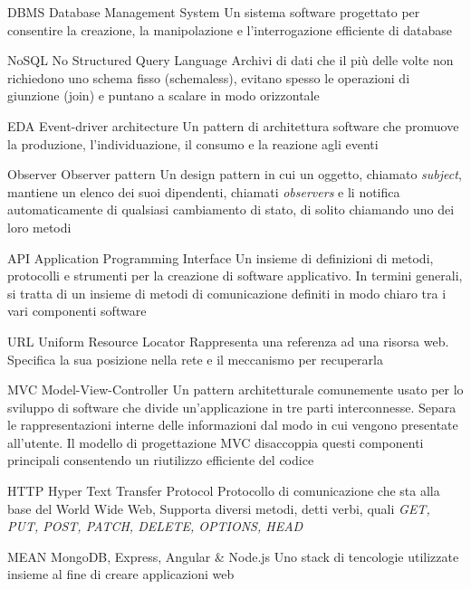 {DBMS}            %
{Database Management System}  %
{Un sistema software progettato per consentire la creazione, la manipolazione e l'interrogazione efficiente di database} %

{NoSQL}            %
{No Structured Query Language}  %
{Archivi di dati che il più delle volte non richiedono uno schema fisso (schemaless), evitano spesso le operazioni di giunzione (join) e puntano a scalare in modo orizzontale} %

{EDA}
{Event-driver architecture}
{Un pattern di architettura software che promuove la produzione, l'individuazione, il consumo e la reazione agli eventi}


{Observer}
{Observer pattern}
{Un design pattern in cui un oggetto, chiamato \textit{subject}, mantiene un elenco dei suoi dipendenti, chiamati \textit{observers} e li notifica automaticamente di qualsiasi cambiamento di stato, di solito chiamando uno dei loro metodi}


{API}
{Application Programming Interface}
{Un insieme di definizioni di metodi, protocolli e strumenti per la creazione di software applicativo. In termini generali, si tratta di un insieme di metodi di comunicazione definiti in modo chiaro tra i vari componenti software}

{URL}
{Uniform Resource Locator}
{Rappresenta una referenza ad una risorsa web. Specifica la sua posizione nella rete e il meccanismo per recuperarla}

{MVC}
{Model-View-Controller}
{
Un pattern architetturale comunemente usato per lo sviluppo di software che divide un'applicazione in tre parti interconnesse. Separa le rappresentazioni interne delle informazioni dal modo in cui vengono presentate all'utente. Il modello di progettazione MVC disaccoppia questi componenti principali consentendo un riutilizzo efficiente del codice
}

{HTTP}
{Hyper Text Transfer Protocol}
{Protocollo di comunicazione che sta alla base del World Wide Web, Supporta diversi metodi, detti verbi, quali \textit{GET, PUT, POST, PATCH, DELETE, OPTIONS, HEAD}}

{MEAN}
{MongoDB, Express, Angular \& Node.js}
{Uno stack di tencologie utilizzate insieme al fine di creare applicazioni web}


